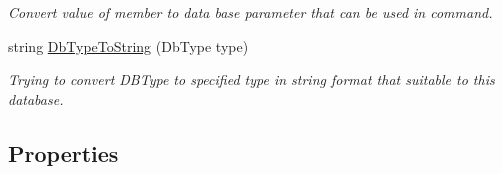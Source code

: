 \begin{DoxyCompactItemize}
\begin{DoxyCompactList}\small\item\em Convert value of member to data base parameter that can be used in command. \end{DoxyCompactList}\item 
string \mbox{\hyperlink{class_uniform_data_operator_1_1_sql_1_1_my_sql_1_1_my_sql_data_operator_a7b854ebbcdf31c67716d8c365c321a31}{Db\+Type\+To\+String}} (Db\+Type type)
\begin{DoxyCompactList}\small\item\em Trying to convert D\+B\+Type to specified type in string format that suitable to this database. \end{DoxyCompactList}\end{DoxyCompactItemize}
\subsection*{Properties}
